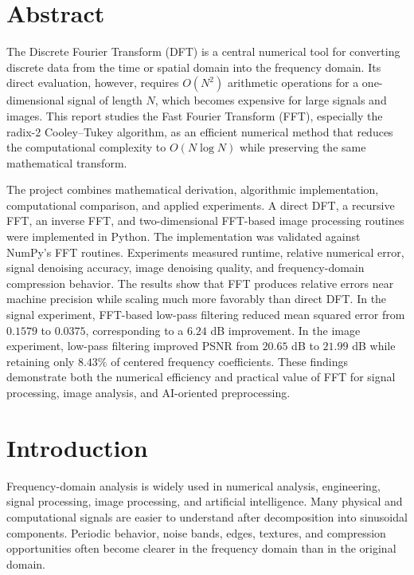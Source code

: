 \documentclass{zc-ust-hw}
\newcommand{\SignalNoisyMSE}{0.1579}
\newcommand{\SignalFilteredMSE}{0.0375}
\newcommand{\SignalImprovementDb}{6.24}
\newcommand{\ImageNoisyPSNR}{20.65}
\newcommand{\ImageLowPassPSNR}{21.99}
\newcommand{\ImageLowPassCoeff}{8.43}
\begin{document}
\maketitle
\tableofcontents
\pagebreak

\section{Abstract}
The Discrete Fourier Transform (DFT) is a central numerical tool for converting discrete data from the time or spatial domain into the frequency domain. Its direct evaluation, however, requires \(O(N^2)\) arithmetic operations for a one-dimensional signal of length \(N\), which becomes expensive for large signals and images. This report studies the Fast Fourier Transform (FFT), especially the radix-2 Cooley--Tukey algorithm, as an efficient numerical method that reduces the computational complexity to \(O(N\log N)\) while preserving the same mathematical transform.

The project combines mathematical derivation, algorithmic implementation, computational comparison, and applied experiments. A direct DFT, a recursive FFT, an inverse FFT, and two-dimensional FFT-based image processing routines were implemented in Python. The implementation was validated against NumPy's FFT routines. Experiments measured runtime, relative numerical error, signal denoising accuracy, image denoising quality, and frequency-domain compression behavior. The results show that FFT produces relative errors near machine precision while scaling much more favorably than direct DFT. In the signal experiment, FFT-based low-pass filtering reduced mean squared error from \(\SignalNoisyMSE\) to \(\SignalFilteredMSE\), corresponding to a \(\SignalImprovementDb\) dB improvement. In the image experiment, low-pass filtering improved PSNR from \(\ImageNoisyPSNR\) dB to \(\ImageLowPassPSNR\) dB while retaining only \(\ImageLowPassCoeff\%\) of centered frequency coefficients. These findings demonstrate both the numerical efficiency and practical value of FFT for signal processing, image analysis, and AI-oriented preprocessing.

\section{Introduction}
Frequency-domain analysis is widely used in numerical analysis, engineering, signal processing, image processing, and artificial intelligence. Many physical and computational signals are easier to understand after decomposition into sinusoidal components. Periodic behavior, noise bands, edges, textures, and compression opportunities often become clearer in the frequency domain than in the original domain.
\end{document}
